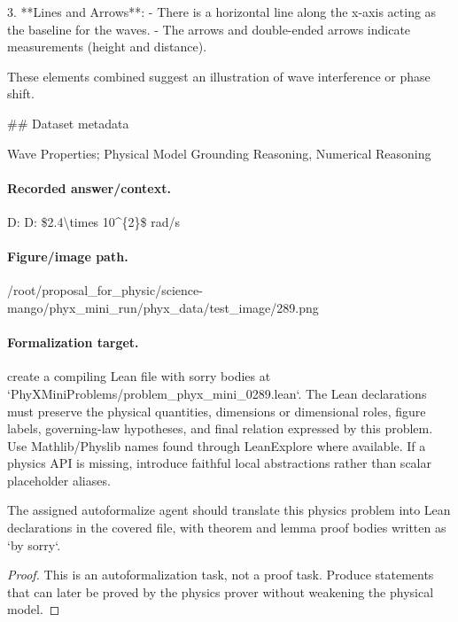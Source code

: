 3. **Lines and Arrows**:
   - There is a horizontal line along the x-axis acting as the baseline for the waves.
   - The arrows and double-ended arrows indicate measurements (height and distance).
  
These elements combined suggest an illustration of wave interference or phase shift.

\#\# Dataset metadata

Wave Properties; Physical Model Grounding Reasoning, Numerical Reasoning

\paragraph{Recorded answer/context.}
D: D: \$2.4\textbackslash{}times 10\textasciicircum{}\{2\}\$ rad/s

\paragraph{Figure/image path.}
/root/proposal\_for\_physic/science-mango/phyx\_mini\_run/phyx\_data/test\_image/289.png

\paragraph{Formalization target.}
create a compiling Lean file with sorry bodies at `PhyXMiniProblems/problem\_phyx\_mini\_0289.lean`. The Lean declarations must preserve the physical quantities, dimensions or dimensional roles, figure labels, governing-law hypotheses, and final relation expressed by this problem.
Use Mathlib/Physlib names found through LeanExplore where available. If a physics API is missing, introduce faithful local abstractions rather than scalar placeholder aliases.

\begin{theorem}
\label{thm:physics:phyx_mini_0289:target}
The assigned autoformalize agent should translate this physics problem into Lean declarations in the covered file, with theorem and lemma proof bodies written as `by sorry`.
\end{theorem}
\begin{proof}
This is an autoformalization task, not a proof task. Produce statements that can later be proved by the physics prover without weakening the physical model.
\end{proof}

